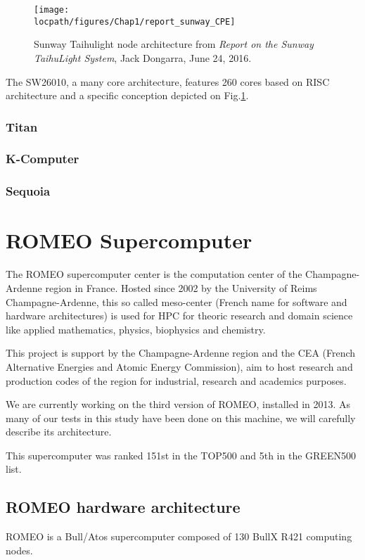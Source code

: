 \begin{figure}
\centering
\texttt{[image: \\locpath/figures/Chap1/report\_sunway\_CPE]}
\caption{Sunway Taihulight node architecture from \textit{Report on the Sunway TaihuLight System}, Jack Dongarra, June 24, 2016.}
\label{fig:chap1_report_sunway_CPE}
\end{figure}

The SW26010, a many core architecture, features 260 cores based on RISC architecture and a specific conception depicted on Fig.\ref{fig:chap1_report_sunway_CPE}.


\subsubsection{Titan}

\subsubsection{K-Computer}
\subsubsection{Sequoia}
\section{ROMEO Supercomputer}

The ROMEO supercomputer center is the computation center of the Champagne-Ardenne region in France. 
Hosted since 2002 by the University of Reims Champagne-Ardenne, this so called meso-center (French name for software and hardware architectures) is used for HPC for theoric research and domain science like applied mathematics, physics, biophysics and chemistry. 

This project is support by the Champagne-Ardenne region and the CEA (French Alternative Energies and Atomic Energy Commission), aim to host research and production codes of the region for industrial, research and academics purposes. 

We are currently working on the third version of ROMEO, installed in 2013. 
As many of our tests in this study have been done on this machine, we will carefully describe its architecture. 

This supercomputer was ranked 151st in the TOP500 and 5th in the GREEN500 list. 

\subsection{ROMEO hardware architecture}
ROMEO is a Bull/Atos supercomputer composed of 130 BullX R421 computing nodes. 


